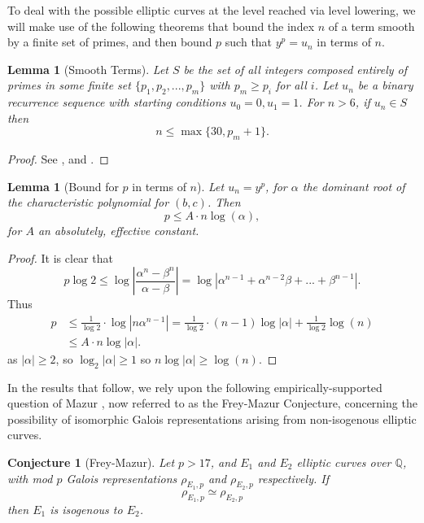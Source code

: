 \documentclass[12pt]{amsart}
\newtheorem{lem}[thm]{Lemma}
\newtheorem{conj}[thm]{Conjecture}
\theoremstyle{definition}
\def\Q{{\mathbb Q}}
\newcommand{\bfrac}[2]{\left| \frac{#1}{#2} \right|}
\begin{document}
To deal with the possible elliptic curves at the level reached via level lowering, we will make use of the following theorems that bound the index $n$ of a term smooth by a finite set of primes, and then bound $p$ such that $y^p = u_n$ in terms of $n$.

\begin{lem}[Smooth Terms]\label{smoothterm}
Let $S$ be the set of all integers composed entirely of primes in some finite set $\{p_1,p_2,...,p_m\}$ with $p_m \geq p_i$ for all $i$.  Let $u_n$ be a binary recurrence sequence with starting conditions $u_0 = 0, u_1 = 1$.  For $n > 6$, if $u_n \in S$ then
\[ n \leq \max\{30, p_m +1 \}. \]
\end{lem}
\begin{proof}
See \cite{gyory81}, \cite{gyory82} and \cite{gyory03}.
\end{proof}

\begin{lem}[Bound for $p$ in terms of $n$]\label{boundpintermsn}
Let $u_n = y^p$, for $\alpha$ the dominant root of the characteristic polynomial for $(b,c)$.  Then
\[ p \leq A \cdot n \log(\alpha), \]
for $A$ an absolutely, effective constant.
\end{lem}

\begin{proof}
It is clear that
\[p\log{2} \leq \log \bfrac{\alpha^n - \beta^n}{\alpha-\beta}  = \log|\alpha^{n-1}+ \alpha^{n-2}\beta+...+\beta^{n-1}|. \]
Thus
\begin{align*}
p & \leq  \frac{1}{\log{2}} \cdot \log|n\alpha^{n-1}| = \frac{1}{\log{2}} \cdot (n-1)\log|\alpha| + \frac{1}{\log{2}} \log(n)  \\
& \leq A\cdot n \log|\alpha|.
\end{align*}
as $|\alpha| \geq 2$, so $\log_2|\alpha| \geq 1$ so $n\log|\alpha| \geq  \log(n)$.
\end{proof}

In the results that follow, we rely upon the following empirically-supported question of Mazur \cite{mazur78}, now referred to as the Frey-Mazur Conjecture, concerning the possibility of isomorphic Galois representations arising from non-isogenous elliptic curves.

\begin{conj}[Frey-Mazur]\label{FreyMazur}
Let $p > 17$, and $E_1$ and $E_2$ elliptic curves over $\Q$, with mod $p$ Galois representations $\rho_{E_1,p}$ and $\rho_{E_2,p}$ respectively.  If
\[ \rho_{E_1,p} \simeq \rho_{E_2,p} \]
then $E_1$ is isogenous to $E_2$.
\end{conj}
\end{document}
